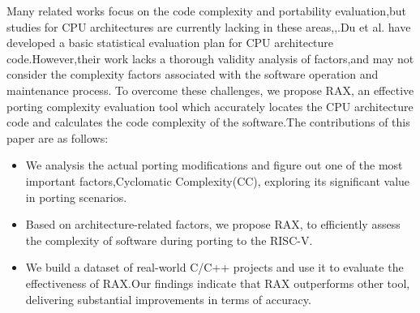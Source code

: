 \documentclass[sigconf,screen,review,anonymous]{acmart}
\begin{document}
Many related works focus on the code complexity and portability evaluation,but studies for CPU architectures are currently lacking in these areas\cite{2016helei},\cite{TAHIR2016101},\cite{Sholiq_2021}.Du et al. have developed a basic statistical evaluation plan for CPU architecture code\citep{2023du}.However,their work lacks a thorough validity analysis of factors,and may not consider the complexity factors associated with the software operation and maintenance process.
To overcome these challenges, we propose RAX, an effective porting
complexity evaluation tool which accurately locates the CPU architecture code and calculates the code complexity of the software.The contributions of this paper are as follows:
\begin{itemize}
  \item We analysis the actual porting modifications and figure out one of the most important factors,Cyclomatic Complexity(CC), exploring its significant value in porting scenarios.
  \item Based on architecture-related factors, we propose RAX, to efficiently assess the complexity of software during porting to the RISC-V.
  \item We build a dataset of real-world C/C++ projects and use it to evaluate the effectiveness of RAX.Our findings indicate that RAX outperforms other tool, delivering substantial improvements in terms of accuracy.
\end{itemize}

\end{document}
